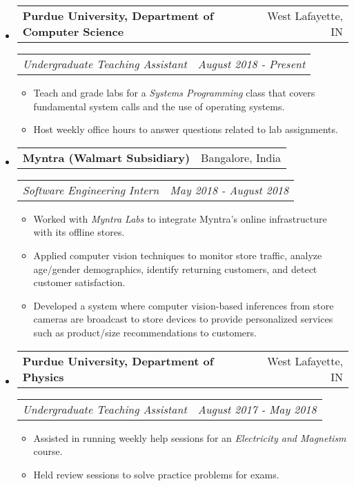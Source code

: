 \documentclass[letterpaper, 11pt]{article}
\makeatletter
\newcommand{\resitem}[1]{\item #1 \vspace{-2pt}}
\newcommand{\resheading}[1]{{\large \parashade[.9]{sharpcorners}{\textbf{#1 \vphantom{p\^{E}}}}}}
\newcommand{\ressubheadinga}[2]{
\begin{tabular*}{7.11in}{l@{\extracolsep{\fill}}r}
		\textbf{#1} & #2 \\
\end{tabular*}}
\newcommand{\ressubheadingb}[2]{
\begin{tabular*}{7.11in}{l@{\extracolsep{\fill}}r}
		\textit{#1} & \textit{#2} \\
\end{tabular*}\vspace{-6pt}}
\makeatother
\begin{document}
\begin{itemize}
\item
    \ressubheadinga{Purdue University, Department of Computer Science}{West Lafayette, IN}
    \ressubheadingb{Undergraduate Teaching Assistant}{August 2018 - Present}
    \begin{itemize}
        \resitem{Teach and grade labs for a \emph{Systems Programming} class that covers fundamental system calls and the use of operating systems.}
        \resitem{Host weekly office hours to answer questions related to lab assignments.}
    \end{itemize}
\end{itemize}

\begin{itemize}
\item
	\ressubheadinga{Myntra (Walmart Subsidiary)}{Bangalore, India}
	\ressubheadingb{Software Engineering Intern}{May 2018 - August 2018}
	\begin{itemize}
        \resitem{Worked with \emph{Myntra Labs} to integrate Myntra's online infrastructure with its offline stores.}
		\resitem{Applied computer vision techniques to monitor store traffic, analyze age/gender demographics, identify returning customers, and detect customer satisfaction.}
		\resitem{Developed a system where computer vision-based inferences from store cameras are broadcast to store devices to provide personalized services such as product/size recommendations to customers.}
	\end{itemize}
\end{itemize}

\begin{itemize}
\item
    \ressubheadinga{Purdue University, Department of Physics}{West Lafayette, IN}
    \ressubheadingb{Undergraduate Teaching Assistant}{August 2017 - May 2018}
    \begin{itemize}
        \resitem{Assisted in running weekly help sessions for an \textit{Electricity and Magnetism} course.}
        \resitem{Held review sessions to solve practice problems for exams.}
    \end{itemize}
\end{itemize}

\vspace{-0.16in}
\resheading{Projects}
\vspace{-0.235in}
\end{document}
